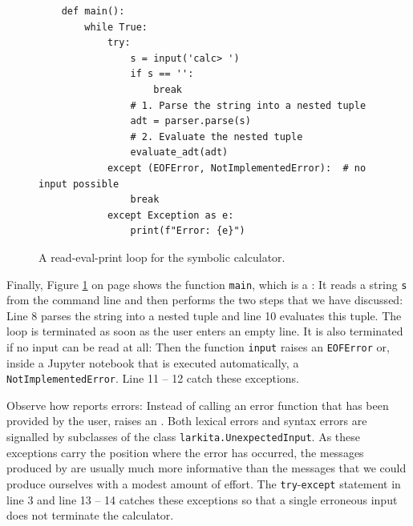 \begin{figure}[!ht]
\centering
\begin{verbatim}
    def main():
        while True:
            try:
                s = input('calc> ')
                if s == '':
                    break
                # 1. Parse the string into a nested tuple
                adt = parser.parse(s)
                # 2. Evaluate the nested tuple
                evaluate_adt(adt)
            except (EOFError, NotImplementedError):  # no input possible
                break
            except Exception as e:
                print(f"Error: {e}")
\end{verbatim}
\vspace*{-0.3cm}
\caption{A read-eval-print loop for the symbolic calculator.}
\label{fig:01-Calculator.ipynb:main}
\end{figure}

\noindent
Finally, Figure \ref{fig:01-Calculator.ipynb:main} on page \pageref{fig:01-Calculator.ipynb:main} shows
the function \texttt{main}, which is a :  It reads a string \texttt{s} from the
command line and then performs the two steps that we have discussed:  Line 8 parses the string into a nested
tuple and line 10 evaluates this tuple.  The loop is terminated as soon as the user enters an empty line.  It is
also terminated if no input can be read at all:  Then the function \texttt{input} raises an \texttt{EOFError}
or, inside a Jupyter notebook that is executed automatically, a \texttt{NotImplementedError}.  Line 11 -- 12
catch these exceptions.

Observe how  reports errors:  Instead of calling an error function that has been provided
by the user,  raises an .  Both lexical errors and syntax errors are
signalled by subclasses of the class \texttt{larkita.UnexpectedInput}.  As these exceptions carry
the position where the error has occurred, the messages produced by  are usually much more
informative than the messages that we could produce ourselves with a modest amount of effort.  The
\texttt{try}-\texttt{except} statement in line 3 and line 13 -- 14 catches these exceptions so that a
single erroneous input does not terminate the calculator.

